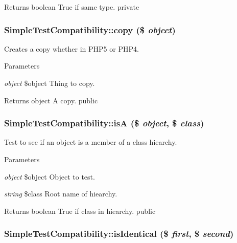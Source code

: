 \begin{DoxyReturn}{Returns}
boolean True if same type.  private 
\end{DoxyReturn}
\hypertarget{class_simple_test_compatibility_afacf09456e0799679791c5de62288b5f}{
\subsubsection[{copy}]{\setlength{\rightskip}{0pt plus 5cm}SimpleTestCompatibility::copy (\$ {\em object})}}
\label{class_simple_test_compatibility_afacf09456e0799679791c5de62288b5f}
Creates a copy whether in PHP5 or PHP4. 
\begin{DoxyParams}{Parameters}
\item[{\em object}]\$object Thing to copy. \end{DoxyParams}
\begin{DoxyReturn}{Returns}
object A copy.  public 
\end{DoxyReturn}
\hypertarget{class_simple_test_compatibility_a4bb903a3687e510b0ccf712e99149965}{
\subsubsection[{isA}]{\setlength{\rightskip}{0pt plus 5cm}SimpleTestCompatibility::isA (\$ {\em object}, \/  \$ {\em class})}}
\label{class_simple_test_compatibility_a4bb903a3687e510b0ccf712e99149965}
Test to see if an object is a member of a class hiearchy. 
\begin{DoxyParams}{Parameters}
\item[{\em object}]\$object Object to test. \item[{\em string}]\$class Root name of hiearchy. \end{DoxyParams}
\begin{DoxyReturn}{Returns}
boolean True if class in hiearchy.  public 
\end{DoxyReturn}
\hypertarget{class_simple_test_compatibility_a51ae07b91b8b9db204faca7c23795417}{
\subsubsection[{isIdentical}]{\setlength{\rightskip}{0pt plus 5cm}SimpleTestCompatibility::isIdentical (\$ {\em first}, \/  \$ {\em second})}}
